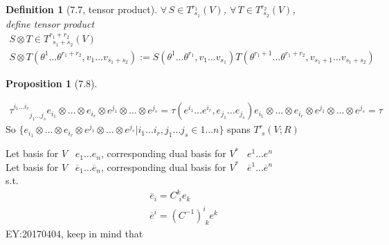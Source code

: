 \documentclass[10pt]{amsart}
\newtheorem{proposition}{Proposition}
\newtheorem{definition}{Definition}
\newcommand{\exercisehead}[1]
  { \smallskip
   \noindent{\small\bf Exercise #1.}
  }
\begin{document}
\begin{multicols*}{2}
\begin{definition}[7.7\cite{JLee2009}, tensor product]
$\forall \, S\in T^{r_1}_{ \,\, s_1}(V)$, $\forall \, T \in T^{r_2}_{ \,\, s_2}(V)$, \\
define tensor product 
\begin{equation}
\begin{gathered}
S\otimes T\in T^{r_1+r_2}_{ \, \, \, s_1+s_2}(V) \\
	S\otimes T( \theta^1\dots \theta^{r_1 + r_2}, v_1 \dots v_{s_1+s_2}) := S(\theta^1\dots \theta^{r_1}, v_1\dots v_{s_1})T(\theta^{r_1+1}\dots \theta^{r_1+r_2}, v_{s_1+1}\dots v_{s_1 + s_2} )
\end{gathered}
\end{equation}
\end{definition}

\begin{proposition}[7.8\cite{JLee2009}]
\end{proposition}







\[
\begin{gathered}
	\tau^{ i_1 \dots i_r }_{ \phantom{i_1 \dots i_r} j_1 \dots j_s} e_{i_1} \otimes \dots \otimes e_{i_r} \otimes e^{j_1}\otimes \dots \otimes e^{j_s} = \tau(e^{i_1} \dots e^{i_r}, e_{j_1} \dots e_{j_s} )e_{i_1} \otimes \dots \otimes e_{i_r} \otimes e^{j_1} \otimes \dots \otimes e^{j_s} = \tau 
\end{gathered}
\]
So $\lbrace e_{i_1}\otimes \dots \otimes e_{i_r} \otimes e^{j_1} \otimes \dots \otimes e^{j_s} | i_1 \dots i_{r}, j_1\dots j_s \in 1 \dots n \rbrace$ spans $T^r_{\,\, s}(V;R)$

\exercisehead{7.11}  Let basis for $V$ \, $e_1 \dots e_n$, corresponding dual basis for $V^*$ \,  $e^1 \dots e^n$ \\ 
Let basis for $V$ \, $\overline{e}_1 \dots \overline{e}_n$, corresponding dual basis for $V^*$ \,  $\overline{e}^1 \dots \overline{e}^n$ \\
s.t. 
\[
\begin{aligned}
	& \overline{e}_i = C^k_{ \,\, i} e_k \\
	& \overline{e}^i = (C^{-1})^i_{ \, \, k} e^k
\end{aligned}
\]
EY:20170404, keep in mind that
 

\end{multicols*}
\end{document}
